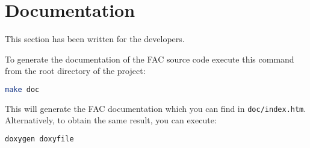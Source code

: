 \section{Documentation}
This section has been written for the developers.

To generate the documentation of the FAC source code execute this command from
the root directory of the project:
\begin{lstlisting}[language=bash,
caption={FAC - doc generation},captionpos=b,frame=single]
make doc
\end{lstlisting}
This will generate the FAC documentation which you can find in
\verb|doc/index.htm|.
\\
Alternatively, to obtain the same result, you can execute:
\begin{lstlisting}[language=bash,
caption={FAC - doc generation (explicit)},captionpos=b,frame=single]
doxygen doxyfile
\end{lstlisting}